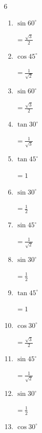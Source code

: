 \begin{multicols}{6}
\begin{enumerate}
        $\displaystyle =\frac{1}{\sqrt{2}}$

  \item $\displaystyle \sin{60^\circ}$

        $\displaystyle =\frac{\sqrt{3}}{2}$

\columnbreak %

  \item $\displaystyle \cos{45^\circ}$

        $\displaystyle =\frac{1}{\sqrt{2}}$

  \item $\displaystyle \sin{60^\circ}$

        $\displaystyle =\frac{\sqrt{3}}{2}$

  \item $\displaystyle \tan{30^\circ}$

        $\displaystyle =\frac{1}{\sqrt{3}}$

  \item $\displaystyle \tan{45^\circ}$

        $\displaystyle =1$

  \item $\displaystyle \sin{30^\circ}$

        $\displaystyle =\frac{1}{2}$

  \item $\displaystyle \sin{45^\circ}$

        $\displaystyle =\frac{1}{\sqrt{2}}$

  \item $\displaystyle \sin{30^\circ}$

        $\displaystyle =\frac{1}{2}$

  \item $\displaystyle \tan{45^\circ}$

        $\displaystyle =1$

  \item $\displaystyle \cos{30^\circ}$

        $\displaystyle =\frac{\sqrt{3}}{2}$

  \item $\displaystyle \sin{45^\circ}$

        $\displaystyle =\frac{1}{\sqrt{2}}$

  \item $\displaystyle \sin{30^\circ}$

        $\displaystyle =\frac{1}{2}$

  \item $\displaystyle \cos{30^\circ}$


\end{enumerate}
\end{multicols}
